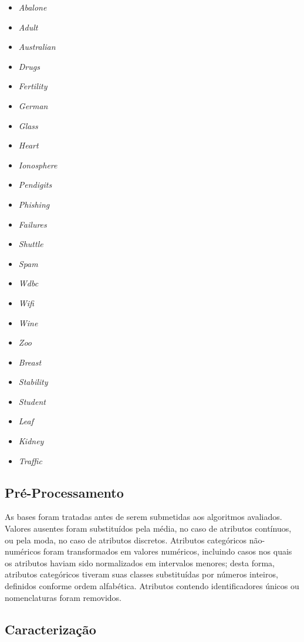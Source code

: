 \documentclass[runningheads]{llncs}
\begin{document}
\begin{itemize}
\item \emph{Abalone}
\item \emph{Adult}
\item \emph{Australian}
\item \emph{Drugs}
\item \emph{Fertility}
\item \emph{German}
\item \emph{Glass}
\item \emph{Heart}
\item \emph{Ionosphere}
\item \emph{Pendigits}
\item \emph{Phishing}
\item \emph{Failures}
\item \emph{Shuttle}
\item \emph{Spam}
\item \emph{Wdbc}
\item \emph{Wifi}
\item \emph{Wine}
\item \emph{Zoo}
\item \emph{Breast}
\item \emph{Stability}
\item \emph{Student}
\item \emph{Leaf}
\item \emph{Kidney}
\item \emph{Traffic}
\end{itemize}

\subsection{Pré-Processamento}

As bases foram tratadas antes de serem submetidas aos algoritmos avaliados. Valores ausentes foram substituídos pela média, no caso de atributos contínuos, ou pela moda, no caso de atributos discretos. Atributos categóricos não-numéricos foram transformados em valores numéricos, incluindo casos nos quais os atributos haviam sido normalizados em intervalos menores; desta forma, atributos categóricos tiveram suas classes substituídas por números inteiros, definidos conforme ordem alfabética. Atributos contendo identificadores únicos ou nomenclaturas foram removidos.

\subsection{Caracterização}
\end{document}
